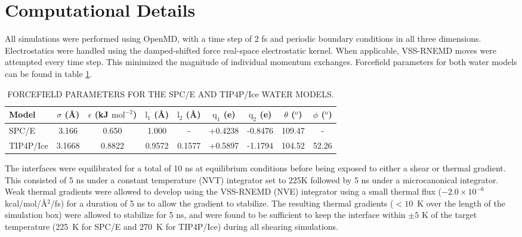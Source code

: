\section{Computational Details}
All simulations were performed using OpenMD,\cite{OOPSE,openmd} with a
time step of 2 fs and periodic boundary conditions in all three
dimensions.  Electrostatics were handled using the damped-shifted
force real-space electrostatic kernel.\cite{Ewald} When applicable,
VSS-RNEMD moves were attempted every time step. This minimized the
magnitude of individual momentum exchanges.  Forcefield parameters for
both water models can be found in table \ref{tab:waterModels}.

\begin{table}[H]
\centering
\caption{FORCEFIELD PARAMETERS FOR THE SPC/E AND TIP4P/Ice WATER MODELS.}
\label{tab:waterModels}
\begin{tabular}{|l|c|c|c|c|c|c|c|c|} 
\hline
  Model &  $\sigma$ (\AA) & $\epsilon$ (kJ $\mathrm{mol}^{-2}$) &
                                                              $\mathrm{l}_{1}$
                                                              (\AA) &
                                                                    $\mathrm{l}_{2}$
                                                                      (\AA)
  & $\mathrm{q}_{1}$ (e) & $\mathrm{q}_{2}$ (e) & $\theta$
                                                  ($^{\mathrm{o}}$) &
                                                                      $\phi$ ($^{\mathrm{o}}$) \\ \hline
  SPC/E & 3.166 & 0.650 & 1.000 & - & +0.4238 & -0.8476 & 109.47 & - \\
  TIP4P/Ice & 3.1668 & 0.8822 & 0.9572 & 0.1577 & +0.5897 & -1.1794 &
  104.52 & 52.26 \\
\hline
\end{tabular}
\end {table}


The interfaces were equilibrated for a total of 10 ns at equilibrium
conditions before being exposed to either a shear or thermal gradient.
This consisted of 5 ns under a constant temperature (NVT) integrator
set to 225K followed by 5 ns under a microcanonical integrator.  Weak
thermal gradients were allowed to develop using the VSS-RNEMD (NVE)
integrator using a small thermal flux ($-2.0\times 10^{-6}$
kcal/mol/\AA$^2$/fs) for a duration of 5 ns to allow the gradient to
stabilize.  The resulting thermal gradients ($< 10$~K over the length
of the simulation box) were allowed to stabilize for 5 ns, and were
found to be sufficient to keep the interface within $\pm 5$ K of the
target temperature (225~K for SPC/E and 270~K for TIP4P/Ice) during
all shearing simulations.


